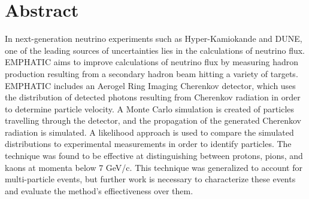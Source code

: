 
\chapter{Abstract}

In next-generation neutrino experiments such as Hyper-Kamiokande and DUNE, one of the leading sources of uncertainties lies in the calculations of neutrino flux.
 \ac{EMPHATIC} aims to improve calculations of neutrino flux by measuring hadron production resulting from a secondary hadron beam hitting a variety of targets.
\ac{EMPHATIC} includes an Aerogel Ring Imaging Cherenkov detector, which uses the distribution of detected photons resulting from Cherenkov radiation in order to determine particle velocity.
A Monte Carlo simulation is created of particles travelling through the detector, and the propagation of the generated Cherenkov radiation is simulated.
A likelihood approach is used to compare the simulated distributions to experimental measurements in order to identify particles.
The technique was found to be effective at distinguishing between protons, pions, and kaons at momenta below 7 GeV/c.
This technique was generalized to account for multi-particle events, but further work is necessary to characterize these events and evaluate the method's effiectiveness over them.

\vfill
\begin{center}
\begin{sf}
\end{sf}
\end{center}
